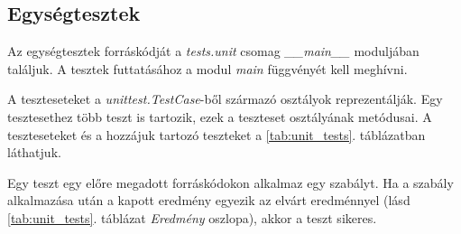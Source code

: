\subsection{Egységtesztek}

Az egységtesztek forráskódját a \emph{tests.unit} csomag \emph{\_\_main\_\_}
moduljában találjuk. A tesztek futtatásához a modul \emph{main} függvényét kell meghívni.

A teszteseteket a \emph{unittest.TestCase}-ből származó osztályok reprezentálják.
Egy tesztesethez több teszt is tartozik, ezek a teszteset osztályának metódusai.
A teszteseteket és a hozzájuk tartozó teszteket a \ref{tab:unit_tests}. táblázatban láthatjuk.

Egy teszt egy előre megadott forráskódokon alkalmaz egy szabályt.
Ha a szabály alkalmazása után a kapott eredmény egyezik az elvárt eredménnyel
(lásd \ref{tab:unit_tests}. táblázat \emph{Eredmény} oszlopa), akkor a teszt sikeres.


